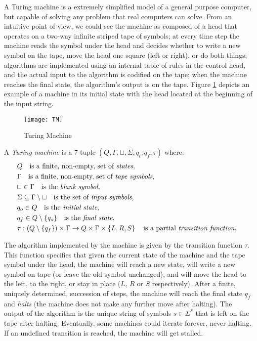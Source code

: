 A Turing machine is a extremely simplified model of a general purpose computer, but capable of solving any problem that real computers can solve. From an intuitive point of view, we could see the machine as composed of a head that operates on a two-way infinite striped tape of symbols; at every time step the machine reads the symbol under the head and decides whether to write a new symbol on the tape, move the head one square (left or right), or do both things; algorithms are implemented using an internal table of rules in the control head, and the actual input to the algorithm is codified on the tape; when the machine reaches the final state, the algorithm's output is on the tape. Figure \ref{fig:Turing-Machine} depicts an example of a machine in its initial state with the head located at the beginning of the input string.

\begin{figure}[h]
\centering\texttt{[image: TM]}
\caption{\label{fig:Turing-Machine}Turing Machine}
\end{figure}

\begin{definition}
\label{def:Turing-Machine}
A \emph{Turing machine} is a 7-tuple $\left(Q,\Gamma,\sqcup,\Sigma,q_{i},q_{f},\tau\right)$ where:
\begin{align*}
 & Q \quad \text{is a finite, non-empty, set of \emph{states},} \index{Machine State} \\
 & \Gamma \quad \text{is a finite, non-empty, set of \emph{tape symbols},} \index{Tape Symbol} \\
 & \sqcup\in\Gamma \quad \text{is the \emph{blank symbol},} \index{Blank Symbol} \\
 & \Sigma\subseteq\Gamma\setminus\sqcup \quad \text{is the set of \emph{input symbols},}  \index{Input Symbol} \\
 & q_{o}\in Q \quad \text{is the \emph{initial state},} \index{Initial State} \\
 & q_{f}\in Q \setminus \{q_o\} \quad \text{is the \emph{final state},} \index{Final State} \\ 
 & \tau:\left(Q\setminus \{q_{f}\}\right)\times\Gamma \rightarrow  Q\times\Gamma\times\left\{ L,R,S\right\} \quad\text{is a partial \emph{transition function}. \index{Transition Function} }
\end{align*}
\end{definition}

The algorithm implemented by the machine is given by the transition function $\tau$. This function specifies that given the current state of the machine and the tape symbol under the head, the machine will reach a new state, will write a new symbol on tape (or leave the old symbol unchanged), and will move the head to the left, to the right, or stay in place ($L$, $R$ or $S$ respectively). After a finite, uniquely determined, succession of steps, the machine will reach the final state $q_f$ and \emph{halts} (the machine does not make any further move after halting). The output of the algorithm is the unique string of symbols $s \in \Sigma^\ast$  that is left on the tape after halting. Eventually, some machines could iterate forever, never halting. If an undefined transition is reached, the machine will get stalled.

